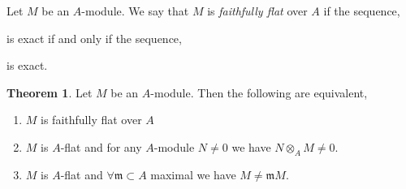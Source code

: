\documentclass[12pt]{article}
\newcommand{\m}{\mathfrak{m}}
\theoremstyle{remark}
\theoremstyle{definition}
\newtheorem{theorem}{Theorem}[section]
\newenvironment{definition}[1][Definition:]{\begin{trivlist}
\item[\hskip \labelsep {\bfseries #1}]}{\end{trivlist}}
\begin{document}
\begin{definition}
Let $M$ be an $A$-module. We say that $M$ is \textit{faithfully flat} over $A$ if the sequence,
\begin{center}
\end{center}
is exact if and only if the sequence,
\begin{center}
\end{center}
is exact.  
\end{definition}

\begin{theorem}
Let $M$ be an $A$-module. Then the following are equivalent,
\begin{enumerate}
\item $M$ is faithfully flat over $A$
\item $M$ is $A$-flat and for any $A$-module $N \neq 0$ we have $N \otimes_A M \neq 0$. 
\item $M$ is $A$-flat and $\forall \m \subset A$ maximal we have $M \neq \m M$. 
\end{enumerate}
\end{theorem}
\end{document}
